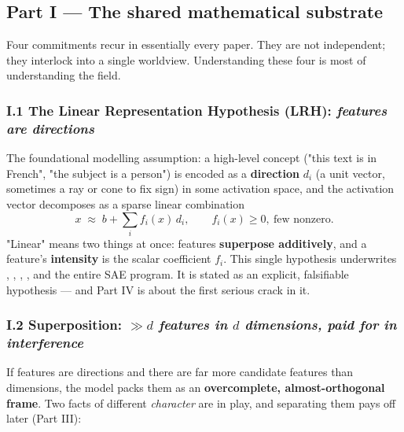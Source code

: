 \subsection*{Part I --- The shared mathematical substrate}

Four commitments recur in essentially every paper. They are not independent; they interlock into a single worldview. Understanding these four is most of understanding the field.


\subsubsection*{I.1 The Linear Representation Hypothesis (LRH): \emph{features are directions}}

The foundational modelling assumption: a high-level concept ("this text is in French", "the subject is a person") is encoded as a \textbf{direction} $d_i$ (a unit vector, sometimes a ray or cone to fix sign) in some activation space, and the activation vector decomposes as a sparse linear combination \[ x \;\approx\; b + \sum_i f_i(x)\, d_i, \qquad f_i(x)\ge 0,\ \text{few nonzero.}\] "Linear" means two things at once: features \textbf{superpose additively}, and a feature's \textbf{intensity} is the scalar coefficient $f_i$. This single hypothesis underwrites \textcite{toy-models-superposition}, \textcite{towards-monosemanticity}, \textcite{scaling-monosemanticity}, \textcite{linear-representation-hypothesis-geometry}, and the entire SAE program. It is stated as an explicit, falsifiable hypothesis --- and Part IV is about the first serious crack in it.


\subsubsection*{I.2 Superposition: \emph{$\gg d$ features in $d$ dimensions, paid for in interference}}

If features are directions and there are far more candidate features than dimensions, the model packs them as an \textbf{overcomplete, almost-orthogonal frame}. Two facts of different \emph{character} are in play, and separating them pays off later (Part III):

